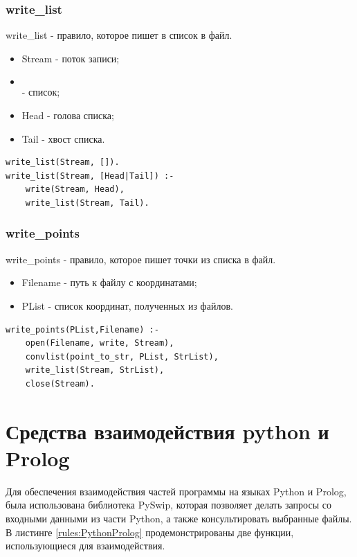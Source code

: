 \subsubsection{write\_list}
\hspace{0.6cm} write\_list - правило, которое пишет в список в файл.

\begin{itemize}
	\item Stream - поток записи;
	\item \[\] - список;
	\item Head - голова списка;
	\item Tail - хвост списка.
\end{itemize}

\begin{lstlisting}[caption=Реализация правила write\_list, label=rules:writelist]
write_list(Stream, []).
write_list(Stream, [Head|Tail]) :-
	write(Stream, Head),
	write_list(Stream, Tail).
\end{lstlisting}

\subsubsection{write\_points} 
\hspace{0.6cm} write\_points - правило, которое пишет точки из списка в файл.

\begin{itemize}
	\item Filename - путь к файлу с координатами;
	\item PList - список координат, полученных из файлов.
\end{itemize}

\begin{lstlisting}[caption=Реализация правила write\_points, label=rules:writepoints]
write_points(PList,Filename) :-
    open(Filename, write, Stream),
    convlist(point_to_str, PList, StrList),
	write_list(Stream, StrList),
    close(Stream).
\end{lstlisting}

\section{Средства взаимодействия python и Prolog}

\hspace{0.6cm} Для обеспечения взаимодействия частей программы на языках Python и Prolog, была использована библиотека PySwip, которая позволяет делать запросы со входными данными из части Python, а также консультировать выбранные файлы. В листинге \ref{rules:PythonProlog} продемонстрированы две функции, использующиеся для взаимодействия.

